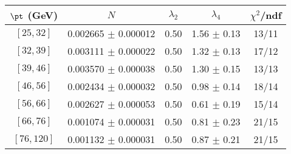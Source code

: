 \begin{tabular}{c||c|c|c|c}
$\pt$ (GeV) & $N$ & $\lambda_{2}$ & $\lambda_4$  & $\chi^2$/ndf  \\
\hline
$[25, 32]$ & 0.002665 $\pm$ 0.000012 & 0.50 & 1.56 $\pm$ 0.13 & 13/11\\
$[32, 39]$ & 0.003111 $\pm$ 0.000022 & 0.50 & 1.32 $\pm$ 0.13 & 17/12\\
$[39, 46]$ & 0.003570 $\pm$ 0.000038 & 0.50 & 1.30 $\pm$ 0.15 & 13/13\\
$[46, 56]$ & 0.002434 $\pm$ 0.000032 & 0.50 & 0.98 $\pm$ 0.14 & 18/14\\
$[56, 66]$ & 0.002627 $\pm$ 0.000053 & 0.50 & 0.61 $\pm$ 0.19 & 15/14\\
$[66, 76]$ & 0.001074 $\pm$ 0.000031 & 0.50 & 0.81 $\pm$ 0.23 & 21/15\\
$[76, 120]$ & 0.001132 $\pm$ 0.000031 & 0.50 & 0.87 $\pm$ 0.21 & 21/15\\
\end{tabular}
